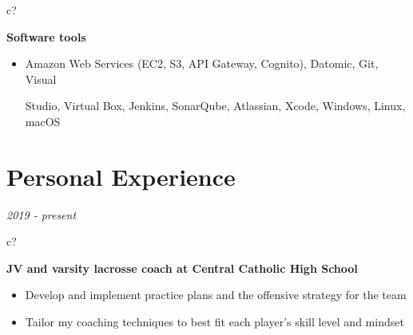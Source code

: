 \documentclass[12pt,a4paper,sans]{moderncv} %
\begin{document}

 \hspace{24.5 mm}
\begin{tabular}{c?}
 \\
\end{tabular}
 \hspace{2 mm}
 \textbf{Software tools}
 
\begin{itemize}
\addtolength{\itemindent}{31.7 mm}
\item{Amazon Web Services (EC2, S3, API Gateway, Cognito), Datomic, Git, Visual 

\hspace{30.5 mm} Studio, Virtual Box, Jenkins, SonarQube, Atlassian, Xcode, Windows, Linux, macOS}


 \hspace{30.5 mm}
\end{itemize}




\vspace{-9 mm}
\section{Personal Experience}

 \textit{2019 - present}
\hspace{-1.7 mm}
\begin{tabular}{c?} \\
\end{tabular}
 \hspace{2 mm}
 \textbf{JV and varsity lacrosse coach at Central Catholic High School} 
 \vspace{0 mm}
 \begin{itemize}
 \addtolength{\itemindent}{31.7 mm}
 \item{Develop and implement practice plans and the offensive strategy for the team}
 \item{Tailor my coaching techniques to best fit each player's skill level and mindset}
 
 \end{itemize}
 
\end{document}

